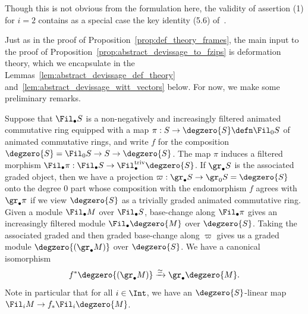 \documentclass[10pt]{amsart}
\begin{document}
\begin{remark}
\label{rem:connection_with_drinfeld_shimurian}
Though this is not obvious from the formulation here, the validity of assertion (1) for $i=2$ contains as a special case the key identity (5.6) of~\cite[Lemma 5.3.3]{drinfeld2023shimurian}. 
\end{remark}

 Just as in the proof of Proposition~\ref{prop:def_theory_frames}, the main input to the proof of Proposition~\ref{prop:abstract_devissage_to_fzips} is deformation theory, which we encapsulate in the Lemmas~\ref{lem:abstract_devissage_def_theory} and~\ref{lem:abstract_devissage_witt_vectors} below. For now, we make some preliminary remarks.

\begin{remark}
\label{rem:increasingly_filtered_modules}
Suppose that $\Fil_\bullet S$ is a non-negatively and increasingly filtered animated commutative ring equipped with a map $\pi:S\to \degzero{S}\defn \Fil_0S$ of animated commutative rings, and write $f$ for the composition $\degzero{S} = \Fil_0S\to S \to \degzero{S}$. The map $\pi$ induces a filtered morphism $\Fil_\bullet \pi:\Fil_\bullet S\to \Fil_\bullet^{\mathrm{triv}}\degzero{S}$. If $\gr_\bullet S$ is the associated graded object, then we have a projection $\varpi:\gr_\bullet S \to \gr_0S = \degzero{S}$ onto the degree $0$ part whose composition with the endomorphism $f$ agrees with $\gr_\bullet \pi$ if we view $\degzero{S}$ as a trivially graded animated commutative ring. Given a module $\Fil_\bullet M$ over $\Fil_\bullet S$, base-change along $\Fil_\bullet\pi$ gives an increasingly filtered module $\Fil_\bullet\degzero{M}$ over $\degzero{S}$. Taking the associated graded and then graded base-change along $\varpi$ gives us a graded module $\degzero{(\gr_\bullet M)}$ over $\degzero{S}$. We have a canonical isomorphism
\[
f^*\degzero{(\gr_\bullet M)}\xrightarrow{\simeq}\gr_\bullet \degzero{M}.
\]
Note in particular that for all $i\in \Int$, we have an $\degzero{S}$-linear map $\Fil_iM\to f_*\Fil_i\degzero{M}$.
\end{remark}
\end{document}

